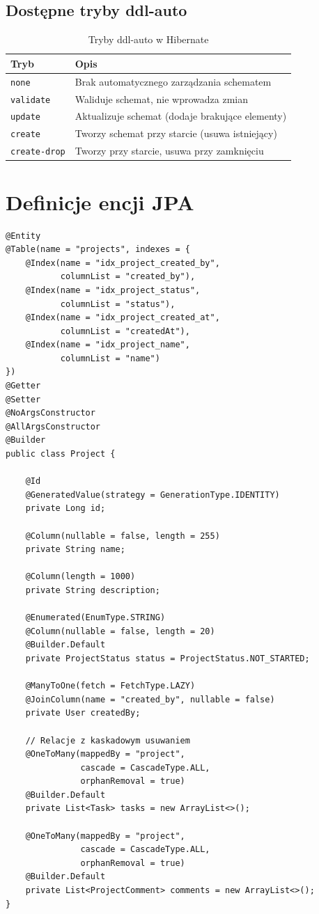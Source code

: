 \documentclass[12pt,a4paper]{report}
\begin{document}
\subsection{Dostępne tryby ddl-auto}

\begin{table}[H]
\centering
\caption{Tryby ddl-auto w Hibernate}
\begin{tabular}{|l|p{10cm}|}
\hline
\textbf{Tryb} & \textbf{Opis} \\
\hline
\texttt{none} & Brak automatycznego zarządzania schematem \\
\texttt{validate} & Waliduje schemat, nie wprowadza zmian \\
\texttt{update} & Aktualizuje schemat (dodaje brakujące elementy) \\
\texttt{create} & Tworzy schemat przy starcie (usuwa istniejący) \\
\texttt{create-drop} & Tworzy przy starcie, usuwa przy zamknięciu \\
\hline
\end{tabular}
\end{table}

\section{Definicje encji JPA}

\begin{lstlisting}[style=javastyle, caption={Encja Project z adnotacjami JPA}]
@Entity
@Table(name = "projects", indexes = {
    @Index(name = "idx_project_created_by", 
           columnList = "created_by"),
    @Index(name = "idx_project_status", 
           columnList = "status"),
    @Index(name = "idx_project_created_at", 
           columnList = "createdAt"),
    @Index(name = "idx_project_name", 
           columnList = "name")
})
@Getter
@Setter
@NoArgsConstructor
@AllArgsConstructor
@Builder
public class Project {

    @Id
    @GeneratedValue(strategy = GenerationType.IDENTITY)
    private Long id;

    @Column(nullable = false, length = 255)
    private String name;

    @Column(length = 1000)
    private String description;

    @Enumerated(EnumType.STRING)
    @Column(nullable = false, length = 20)
    @Builder.Default
    private ProjectStatus status = ProjectStatus.NOT_STARTED;

    @ManyToOne(fetch = FetchType.LAZY)
    @JoinColumn(name = "created_by", nullable = false)
    private User createdBy;

    // Relacje z kaskadowym usuwaniem
    @OneToMany(mappedBy = "project", 
               cascade = CascadeType.ALL, 
               orphanRemoval = true)
    @Builder.Default
    private List<Task> tasks = new ArrayList<>();

    @OneToMany(mappedBy = "project", 
               cascade = CascadeType.ALL, 
               orphanRemoval = true)
    @Builder.Default
    private List<ProjectComment> comments = new ArrayList<>();
}
\end{lstlisting}
\end{document}
